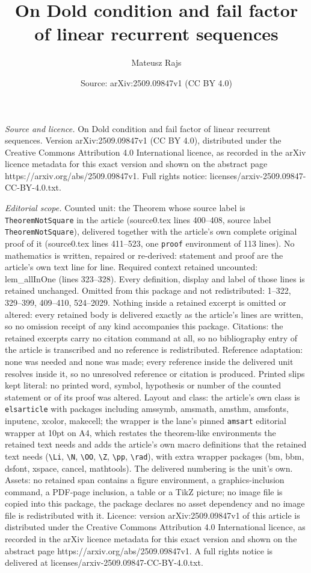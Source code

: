 \documentclass[10pt,a4paper]{amsart}
\title[On Dold condition and fail factor of linear recurrent sequen]{On Dold condition and fail factor of linear recurrent sequences}
\author{Mateusz Rajs}
\date{Source: arXiv:2509.09847v1 (CC BY 4.0)}
\begin{document}
\maketitle

\noindent\emph{Source and licence.} On Dold condition and fail factor of linear recurrent sequences. Version arXiv:2509.09847v1 (CC BY 4.0), distributed under the Creative Commons Attribution 4.0 International licence, as recorded in the arXiv licence metadata for this exact version and shown on the abstract page https://arxiv.org/abs/2509.09847v1. Full rights notice: licenses/arxiv-2509.09847-CC-BY-4.0.txt.\par\smallskip

\noindent\textit{Editorial scope.} Counted unit: the Theorem whose source label is \texttt{TheoremNotSquare} in the article (source0.tex lines 400--408, source label \texttt{TheoremNotSquare}), delivered together with the article's own complete original proof of it (source0.tex lines 411--523, one \texttt{proof} environment of 113 lines). No mathematics is written, repaired or re-derived: statement and proof are the article's own text line for line. Required context retained uncounted: lem\_allInOne (lines 323--328). Every definition, display and label of those lines is retained unchanged. Omitted from this package and not redistributed: 1--322, 329--399, 409--410, 524--2029. Nothing inside a retained excerpt is omitted or altered: every retained body is delivered exactly as the article's lines are written, so no omission receipt of any kind accompanies this package. Citations: the retained excerpts carry no citation command at all, so no bibliography entry of the article is transcribed and no reference is redistributed. Reference adaptation: none was needed and none was made; every reference inside the delivered unit resolves inside it, so no unresolved reference or citation is produced. Printed slips kept literal: no printed word, symbol, hypothesis or number of the counted statement or of its proof was altered. Layout and class: the article's own class is \texttt{elsarticle} with packages including amssymb, amsmath, amsthm, amsfonts, inputenc, xcolor, makecell; the wrapper is the lane's pinned \texttt{amsart} editorial wrapper at 10pt on A4, which restates the theorem-like environments the retained text needs and adds the article's own macro definitions that the retained text needs (\texttt{\textbackslash Li}, \texttt{\textbackslash N}, \texttt{\textbackslash OO}, \texttt{\textbackslash Z}, \texttt{\textbackslash pp}, \texttt{\textbackslash rad}), with extra wrapper packages (bm, bbm, dsfont, xspace, cancel, mathtools). The delivered numbering is the unit's own. Assets: no retained span contains a figure environment, a graphics-inclusion command, a PDF-page inclusion, a table or a TikZ picture; no image file is copied into this package, the package declares no asset dependency and no image file is redistributed with it. Licence: version arXiv:2509.09847v1 of this article is distributed under the Creative Commons Attribution 4.0 International licence, as recorded in the arXiv licence metadata for this exact version and shown on the abstract page https://arxiv.org/abs/2509.09847v1. A full rights notice is delivered at licenses/arxiv-2509.09847-CC-BY-4.0.txt. 
\end{document}
